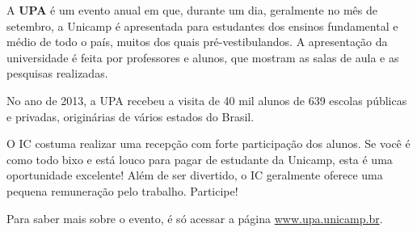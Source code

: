 A \textbf{UPA} é um evento anual em que, durante um dia, geralmente no mês de
setembro, a Unicamp é apresentada para estudantes dos ensinos fundamental e
médio de todo o país, muitos dos quais pré-vestibulandos. A apresentação da
universidade é feita por professores e alunos, que mostram as salas de aula e as
pesquisas realizadas.

No ano de 2013, a UPA recebeu a visita de 40 mil alunos de 639 escolas públicas
e privadas, originárias de vários estados do Brasil.

O IC costuma realizar uma recepção com forte participação dos alunos. Se você é
como todo bixo e está louco para pagar de estudante da Unicamp, esta é uma
oportunidade excelente! Além de ser divertido, o IC geralmente oferece uma
pequena remuneração pelo trabalho. Participe!

Para saber mais sobre o evento, é só acessar a página \url{www.upa.unicamp.br}.
